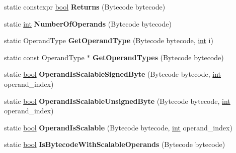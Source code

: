 \begin{DoxyCompactItemize}
static constexpr \mbox{\hyperlink{classbool}{bool}} {\bfseries Returns} (Bytecode bytecode)
\item 
\mbox{\label{classv8_1_1internal_1_1interpreter_1_1Bytecodes_ac87569cd15f31410ddc6ab15978910f3}} 
static \mbox{\hyperlink{classint}{int}} {\bfseries Number\+Of\+Operands} (Bytecode bytecode)
\item 
\mbox{\label{classv8_1_1internal_1_1interpreter_1_1Bytecodes_a93d0bcb86bef7a9650723f904cfe027a}} 
static Operand\+Type {\bfseries Get\+Operand\+Type} (Bytecode bytecode, \mbox{\hyperlink{classint}{int}} i)
\item 
\mbox{\label{classv8_1_1internal_1_1interpreter_1_1Bytecodes_a78416395e9ff08a5c17457d6b4de9da4}} 
static const Operand\+Type $\ast$ {\bfseries Get\+Operand\+Types} (Bytecode bytecode)
\item 
\mbox{\label{classv8_1_1internal_1_1interpreter_1_1Bytecodes_a9ed091523f4cfb266c919b34cb585897}} 
static \mbox{\hyperlink{classbool}{bool}} {\bfseries Operand\+Is\+Scalable\+Signed\+Byte} (Bytecode bytecode, \mbox{\hyperlink{classint}{int}} operand\+\_\+index)
\item 
\mbox{\label{classv8_1_1internal_1_1interpreter_1_1Bytecodes_a524a57f2fd0e3f7029a2d48f7b1cdc68}} 
static \mbox{\hyperlink{classbool}{bool}} {\bfseries Operand\+Is\+Scalable\+Unsigned\+Byte} (Bytecode bytecode, \mbox{\hyperlink{classint}{int}} operand\+\_\+index)
\item 
\mbox{\label{classv8_1_1internal_1_1interpreter_1_1Bytecodes_a7274e07fabb5e66eb74806687c52cc94}} 
static \mbox{\hyperlink{classbool}{bool}} {\bfseries Operand\+Is\+Scalable} (Bytecode bytecode, \mbox{\hyperlink{classint}{int}} operand\+\_\+index)
\item 
\mbox{\label{classv8_1_1internal_1_1interpreter_1_1Bytecodes_af0cf9ed0b1fa6d5cd1f258194cfaadc4}} 
static \mbox{\hyperlink{classbool}{bool}} {\bfseries Is\+Bytecode\+With\+Scalable\+Operands} (Bytecode bytecode)

\end{DoxyCompactItemize}
